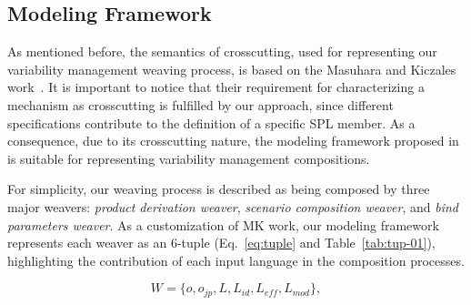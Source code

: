 \documentclass{report}
\begin{document}
\begin{frontmatter}
% 




\section{Modeling Framework}\label{sub:modeling-framework}

As mentioned before, the semantics of crosscutting, used for representing our variability management weaving process, is based on the Masuhara and Kiczales work~\cite{kiczales-ecoop-2003}. 
It is important to notice that their requirement for characterizing a mechanism as crosscutting is fulfilled by our approach, since different specifications contribute to the definition of a specific SPL member. As a consequence, due to its crosscutting nature, the modeling framework proposed in~\cite{kiczales-ecoop-2003}  is suitable for representing variability management compositions. 

For simplicity, our weaving process is described as being composed by three major weavers: \emph{product derivation weaver}, \emph{scenario composition weaver}, and \emph{bind parameters weaver}. As a customization of MK work, our modeling framework represents each weaver as an 6-tuple (Eq.~\ref{eq:tuple} and Table~\ref{tab:tup-01}), highlighting the contribution of each input language in the composition processes. 

\begin{equation}
W = \{o, o_{jp}, L, L_{id}, L_{eff}, L_{mod}\}, 
\label{eq:tuple}
\end{equation}


\end{frontmatter}
\end{document}
